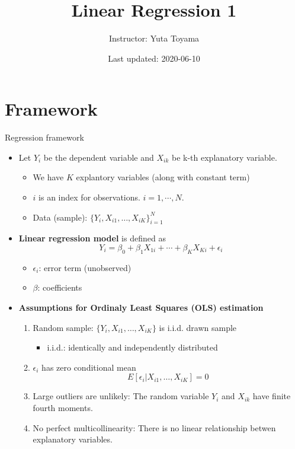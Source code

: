 \documentclass[
  ignorenonframetext,
]{beamer}
\title{Linear Regression 1}
\author{Instructor: Yuta Toyama}
\date{Last updated: 2020-06-10}
\providecommand{\tightlist}{%
  \setlength{\itemsep}{0pt}\setlength{\parskip}{0pt}}
\begin{document}
\frame{\titlepage}

\hypertarget{framework}{%
\section{Framework}\label{framework}}

\begin{frame}{Regression framework}
\protect\hypertarget{regression-framework}{}

\begin{itemize}
\tightlist
\item
  Let \(Y_i\) be the dependent variable and \(X_{ik}\) be k-th
  explanatory variable.

  \begin{itemize}
  \tightlist
  \item
    We have \(K\) explantory variables (along with constant term)
  \item
    \(i\) is an index for observations. \(i = 1,\cdots, N\).
  \item
    Data (sample): \(\{ Y_i , X_{i1}, \ldots, X_{iK} \}_{i=1}^N\)
  \end{itemize}
\item
  \textbf{Linear regression model} is defined as
  \[ Y_{i}=\beta_{0}+\beta_{1}X_{1i}+\cdots+\beta_{K}X_{Ki}+\epsilon_{i} \]

  \begin{itemize}
  \tightlist
  \item
    \(\epsilon_i\): error term (unobserved)
  \item
    \(\beta\): coefficients
  \end{itemize}
\end{itemize}

\end{frame}

\begin{frame}

\begin{itemize}
\tightlist
\item
  \textbf{Assumptions for Ordinaly Least Squares (OLS) estimation}

  \begin{enumerate}
  \tightlist
  \item
    Random sample: \(\{ Y_i , X_{i1}, \ldots, X_{iK} \}\) is i.i.d.
    drawn sample

    \begin{itemize}
    \tightlist
    \item
      i.i.d.: identically and independently distributed
    \end{itemize}
  \item
    \(\epsilon_i\) has zero conditional mean \[
        E[ \epsilon_i | X_{i1}, \ldots, X_{iK}] = 0
        \]
  \item
    Large outliers are unlikely: The random variable \(Y_i\) and
    \(X_{ik}\) have finite fourth moments.
  \item
    No perfect multicollinearity: There is no linear relationship betwen
    explanatory variables.
  \end{enumerate}
\end{itemize}

\end{frame}
\end{document}
